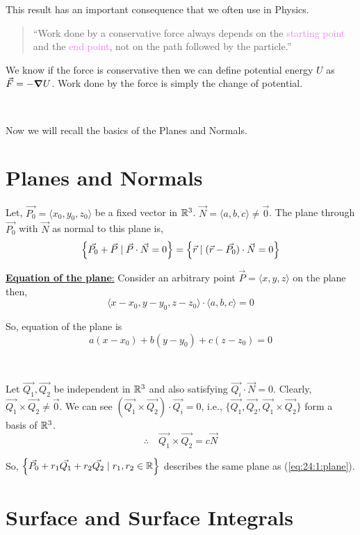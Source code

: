 \documentclass[../Analysis-3.tex]{subfiles}
\begin{document}
This result has an important consequence that we often use in Physics.

\begin{quotation}
  ``Work done by a conservative force always depends on the \textcolor{violet}{starting point} and the \textcolor{violet}{end point}, not on the path followed by the particle.''
\end{quotation}

We know if the force is conservative then we can define potential energy $U$ as $ \vec{F} = -\grad U$. Work done by the force is simply the change of potential.

\

Now we will recall the basics of the Planes and Normals.


\section{Planes and Normals}
Let, $\vec{P_0} = \langle x_0,y_0,z_0 \rangle$ be a fixed vector in $\mathbb{R}^3$. $\vec{N} = \langle a,b,c \rangle \neq \vec{0}$. The plane through $\vec{P_0}$ with $\vec{N}$ as normal to this plane is,
\[ \qty{\vec{P_0} + \vec{P} \mid \vec{P}\cdot \vec{N} = 0} = \qty{\vec{r} \mid (\vec{r}-\vec{P_0})\cdot \vec{N} = 0 } \]

\underline{\textbf{Equation of the plane}:} Consider an arbitrary point $\vec{P} = \langle x,y,z\rangle$ on the plane then, $$\langle x-x_0,y-y_0,z-z_0\rangle \cdot \langle a,b,c \rangle = 0$$

So, equation of the plane is
\begin{equation}
  a(x-x_0)+b(y-y_0) +c(z-z_0)= 0 \label{eq:24:1:plane}
\end{equation}

\

Let $\vec{Q_1},\vec{Q_2}$ be independent in $\mathbb{R}^3$ and also satisfying $\vec{Q_i} \cdot \vec{N} = 0$. Clearly, $\vec{Q_1}\times \vec{Q_2} \neq \vec{0}$. We can see $(\vec{Q_1}\times \vec{Q_2}) \cdot \vec{Q_i} = 0$, i.e., $\{\vec{Q_1},\vec{Q_2},\vec{Q_1}\times \vec{Q_2}\}$ form a basis of $\mathbb{R}^3$.
\[  \therefore \quad \vec{Q_1}\times \vec{Q_2} = c \vec{N} \]

So, $\qty{\vec{P_0} + r_1 \vec{Q_1} + r_2 \vec{Q_2} \mid r_1,r_2 \in \mathbb{R}}$ describes the same plane as (\ref{eq:24:1:plane}).

\section{Surface and Surface Integrals}
\end{document}
